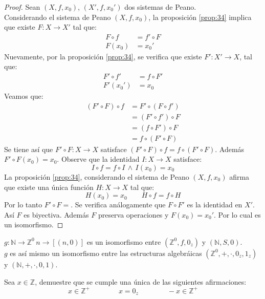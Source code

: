 \begin{proof}
  Sean $(X, f, x_0)$, $(X', f, x_0')$ dos sistemas de Peano. \\
  Considerando el sistema de Peano $(X,f,x_0)$, la proposición \ref{prop:34}
  implica que existe $F: X \rightarrow X'$ tal que:
  \begin{align*}
    F \circ f &= f' \circ F\\
    F(x_0) &= x_0'
  \end{align*}
  Nuevamente, por la proposición \ref{prop:34}, se verifica que existe $F': X'
  \rightarrow X$, tal que:
  \begin{align*}
    F' \circ f' &= f \circ F' \\
    F'(x_0') &= x_0
  \end{align*}
  Veamos que:
  \begin{align*}\label{aux:34}
    (F' \circ F)\circ f &= F' \circ(F\circ f') \\
                        &= (F' \circ f')\circ F \\
                        &=(f\circ F') \circ F \\
                        &= f\circ(F' \circ F)
  \end{align*}
  Se tiene así que $F' \circ F: X \rightarrow X$ satisface $(F'\circ F) \circ
  f = f \circ (F' \circ F)$. Además $F' \circ F (x_0) = x_0$. Observe que la
  identidad $I: X \rightarrow X$ satisface: 
  \[
    I \circ f = f \circ I \, \land \, I(x_0) = x_0
  \]
  La proposición \ref{prop:34}, considerando el sistema de Peano $(X,f,x_0)$
  afirma que existe una única función $H: X \rightarrow X$ tal que:
  \[
    H(x_0) = x_0 \quad \quad H \circ f = f \circ H
  \]
  Por lo tanto $F' \circ F = $. Se verifica análogamente que $F \circ F'$ es
  la identidad en $X'$. Así $F$ es biyectiva. Además $F$ preserva operaciones
  y $F(x_0) = x_0'$. Por lo cual es un isomorfismo.
\end{proof}
\begin{problem}
  $g: \mathbb{N} \rightarrow \mathbb{Z}^0 \, n \rightarrow [(n,0)]$ es un
  isomorfismo entre $(\mathbb{Z}^0, f, 0_z)$ y $(\mathbb{N}, S, 0)$. \\
  $g$ es así mismo un isomorfismo entre las estructuras algebráicas
  $(\mathbb{Z}^0, +, \cdot, 0_z, 1_z)$ y $(\mathbb{N}, +, \cdot, 0, 1)$. 
\end{problem}
\begin{problem}\label{ej:2}
  Sea $x \in \mathbb{Z}$, demuestre que se cumple una única de las siguientes
  afirmaciones:
  \[
    x \in \mathbb{Z^+} \qquad \qquad x = 0_z \qquad \qquad -x \in \mathbb{Z^+}
  \]
\end{problem}
